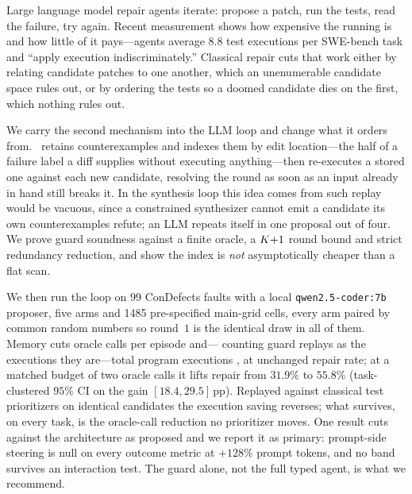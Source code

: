Large language model repair agents iterate: propose a patch, run the tests,
read the failure, try again. Recent measurement shows how expensive the running
is and how little of it pays---agents average $8.8$ test executions per
SWE-bench task and ``apply execution indiscriminately.'' Classical repair cuts
that work either by relating candidate patches to one another, which an
unenumerable candidate space rules out, or by ordering the tests so a doomed
candidate dies on the first, which nothing rules out.

We carry the second mechanism into the LLM loop and change what it orders from.
\CEGMem\ retains counterexamples and indexes them by edit location---the half
of a failure label a diff supplies without executing anything---then
re-executes a stored one against each new candidate, resolving the round as
soon as an input already in hand still breaks it. In the synthesis loop this
idea comes from such replay would be vacuous, since a constrained synthesizer
cannot emit a candidate its own counterexamples refute; an LLM repeats itself
in one proposal out of four. We prove guard soundness against a finite oracle,
a $K{+}1$ round bound and strict redundancy reduction, and show the index
is \emph{not} asymptotically cheaper than a flat scan.

We then run the loop on $99$ ConDefects faults with a local
\texttt{qwen2.5-coder:7b} proposer, five arms and \num{1485} pre-specified
main-grid cells, every arm paired by common random numbers so round~$1$ is the identical
draw in all of them. Memory cuts oracle calls per episode  and---%
counting guard replays as the executions they are---total program executions
, at unchanged repair rate; at a matched budget of two oracle calls
it lifts repair from $31.9\%$ to $55.8\%$ (task-clustered $95\%$ CI on the gain
$[18.4, 29.5]$\,pp). Replayed against classical test prioritizers on identical
candidates the execution saving reverses; what survives, on every task, is the
oracle-call reduction no prioritizer moves. One result cuts against the architecture as proposed and
we report it as primary: prompt-side steering is null on every outcome metric
at $+128\%$ prompt tokens, and no band survives an interaction test. The guard
alone,
not the full typed agent, is what we recommend.

